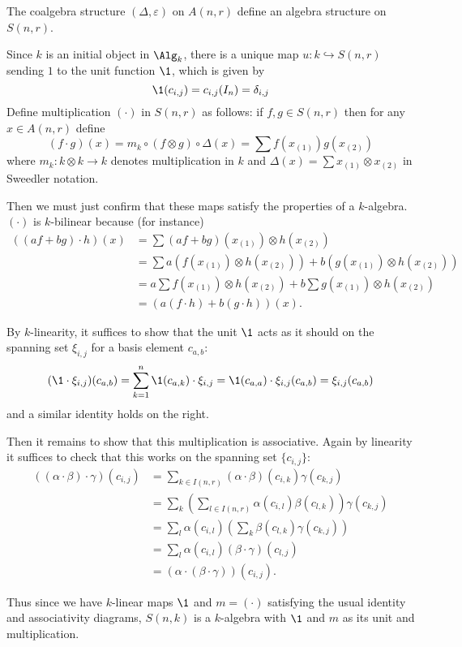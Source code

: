 \documentclass[12pt]{article}
\begin{document}
\begin{lem}
	The coalgebra structure $(\Delta,\varepsilon)$ on $A(n,r)$ define an algebra structure on $S(n,r)$.
\end{lem}
\begin{prf}
	Since $k$ is an initial object in $\Alg_k$, there is a unique map $u:k\hookrightarrow S(n,r)$ sending $1$ to the unit function $\1$, which is given by 
	\[\1(c_{i,j})=c_{i,j}(I_n)=\delta_{i,j}\]
	Define multiplication $(\cdot)$ in $S(n,r)$ as follows: if $f,g\in S(n,r)$ then for any $x\in A(n,r)$ define 
	\[(f\cdot g)(x)=m_k\circ (f\otimes g)\circ \Delta(x)=\sum f(x_{(1)})g(x_{(2)})\]
	where $m_k:k\otimes k\to k$ denotes multiplication in $k$ and $\Delta(x)=\sum x_{(1)}\otimes x_{(2)}$ in Sweedler notation.

	Then we must just confirm that these maps satisfy the properties of a $k$-algebra. $(\cdot)$ is $k$-bilinear because (for instance)
	\begin{align*}
		((af+bg)\cdot h)(x)&=\sum (af+bg)(x_{(1)})\otimes h(x_{(2)})\\
		&=\sum a(f(x_{(1)})\otimes h(x_{(2)}))+b(g(x_{(1)})\otimes h(x_{(2)}))\\
		&= a\sum f(x_{(1)})\otimes h(x_{(2)})+ b\sum g(x_{(1)})\otimes h(x_{(2)})\\
		&=(a(f\cdot h)+b(g\cdot h))(x).
	\end{align*}
	
	By $k$-linearity, it suffices to show that the unit $\1$ acts as it should on the spanning set $\xi_{i,j}$ for a basis element $c_{a,b}$:
	\[(\1\cdot \xi_{i,j})(c_{a,b})=\sum_{k=1}^n \1(c_{a,k})\cdot\xi_{i,j}=\1(c_{a,a})\cdot\xi_{i,j}(c_{a,b})=\xi_{i,j}(c_{a,b})\]
	and a similar identity holds on the right.

	Then it remains to show that this multiplication is associative. Again by linearity it suffices to check that this works on the spanning set $\{c_{i,j}\}$:
	\begin{align*}
		((\alpha\cdot \beta)\cdot\gamma)(c_{i,j})&=\sum_{k\in I(n,r)}(\alpha\cdot\beta)(c_{i,k})\gamma(c_{k,j})\\
		&=\sum_k\left(\sum_{l\in I(n,r)}\alpha(c_{i,l})\beta(c_{l,k})\right)\gamma(c_{k,j})\\
		&=\sum_l\alpha(c_{i,l})\left(\sum_k \beta(c_{l,k})\gamma(c_{k,j})\right)\\
		&=\sum_l\alpha(c_{i,l})(\beta\cdot\gamma)(c_{l,j})\\
		&=(\alpha\cdot(\beta\cdot\gamma))(c_{i,j}).
	\end{align*}

	Thus since we have $k$-linear maps $\1$ and $m=(\cdot)$ satisfying the usual identity and associativity diagrams, $S(n,k)$ is a $k$-algebra 
	with $\1$ and $m$ as its unit and multiplication.
\end{prf}
\end{document}
